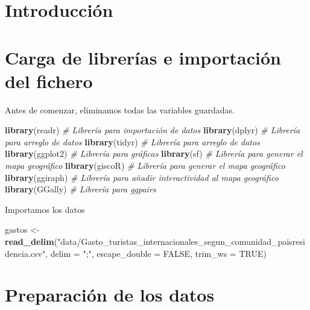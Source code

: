 \documentclass[data,article,submit,moreauthors,pdftex]{Definitions/mdpi}
\newenvironment{Shaded}{\begin{snugshade}}{\end{snugshade}}
\newcommand{\AttributeTok}[1]{\textcolor[rgb]{0.13,0.29,0.53}{#1}}
\newcommand{\CommentTok}[1]{\textcolor[rgb]{0.56,0.35,0.01}{\textit{#1}}}
\newcommand{\ConstantTok}[1]{\textcolor[rgb]{0.56,0.35,0.01}{#1}}
\newcommand{\FunctionTok}[1]{\textcolor[rgb]{0.13,0.29,0.53}{\textbf{#1}}}
\newcommand{\NormalTok}[1]{#1}
\newcommand{\OtherTok}[1]{\textcolor[rgb]{0.56,0.35,0.01}{#1}}
\newcommand{\StringTok}[1]{\textcolor[rgb]{0.31,0.60,0.02}{#1}}
\begin{document}

\section{Introducción}\label{introducciuxf3n}

\section{Carga de librerías e importación del
fichero}\label{carga-de-libreruxedas-e-importaciuxf3n-del-fichero}

Antes de comenzar, eliminamos todas las variables guardadas.

\begin{Shaded}
\begin{Highlighting}[]
\FunctionTok{library}\NormalTok{(readr)  }\CommentTok{\# Librería para importación de datos}
\FunctionTok{library}\NormalTok{(dplyr)  }\CommentTok{\# Librería para arreglo de datos}
\FunctionTok{library}\NormalTok{(tidyr)  }\CommentTok{\# Librería para arreglo de datos}
\FunctionTok{library}\NormalTok{(ggplot2)  }\CommentTok{\# Librería para gráficas}
\FunctionTok{library}\NormalTok{(sf)  }\CommentTok{\# Librería para generar el mapa geográfico}
\FunctionTok{library}\NormalTok{(giscoR)  }\CommentTok{\# Librería para generar el mapa geográfico}
\FunctionTok{library}\NormalTok{(ggiraph)  }\CommentTok{\# Librería para añadir interactividad al mapa geográfico}
\FunctionTok{library}\NormalTok{(GGally)  }\CommentTok{\# Librería para ggpairs}
\end{Highlighting}
\end{Shaded}

Importamos los datos

\begin{Shaded}
\begin{Highlighting}[]
\NormalTok{gastos }\OtherTok{\textless{}{-}} \FunctionTok{read\_delim}\NormalTok{(}\StringTok{"data/Gasto\_turistas\_internacionales\_segun\_comunidad\_paisresidencia.csv"}\NormalTok{,}
    \AttributeTok{delim =} \StringTok{";"}\NormalTok{, }\AttributeTok{escape\_double =} \ConstantTok{FALSE}\NormalTok{, }\AttributeTok{trim\_ws =} \ConstantTok{TRUE}\NormalTok{)}
\end{Highlighting}
\end{Shaded}

\section{Preparación de los datos}\label{preparaciuxf3n-de-los-datos}
\end{document}
